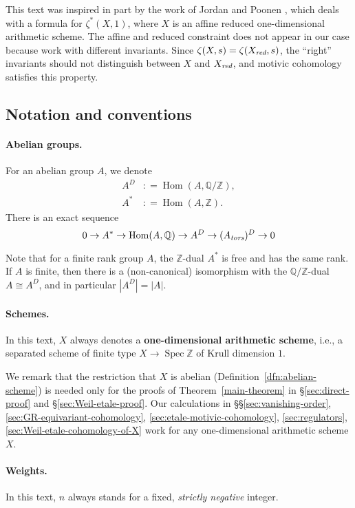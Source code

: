 \documentclass{article}
\DeclareMathOperator{\Hom}{Hom}
\DeclareMathOperator{\Spec}{Spec}
\newcommand{\QQ}{\mathbb{Q}}
\newcommand{\ZZ}{\mathbb{Z}}
\newcommand{\red}{\text{\it red}}
\newcommand{\tors}{\text{\it tors}}
\newcommand{\dfn}{\mathrel{\mathop:}=}
\theoremstyle{myplain}
\theoremstyle{mydefinition}
\begin{document}
This text was inspired in part by the work of Jordan and Poonen
\cite{Jordan-Poonen-2020}, which deals with a formula for $\zeta^* (X,1)$, where
$X$ is an affine reduced one-dimensional arithmetic scheme. The affine and
reduced constraint does not appear in our case because work with different
invariants. Since $\zeta (X,s) = \zeta (X_\red, s)$, the ``right'' invariants
should not distinguish between $X$ and $X_\red$, and motivic cohomology
satisfies this property.

\subsection*{Notation and conventions}

\paragraph{Abelian groups.}
For an abelian group $A$, we denote
\begin{align*}
  A^D & \dfn \Hom (A, \QQ/\ZZ), \\
  A^* & \dfn \Hom (A, \ZZ).
\end{align*}
There is an exact sequence
\begin{equation}
  \label{eqn:exact-sequence-A*-etc}
  0 \to A^* \to \Hom (A,\QQ) \to A^D \to (A_\tors)^D \to 0
\end{equation}

Note that for a finite rank group $A$, the $\ZZ$-dual $A^*$ is free and has the same
rank. If $A$ is finite, then there is a (non-canonical) isomorphism with the
$\QQ/\ZZ$-dual $A \cong A^D$, and in particular $|A^D| = |A|$.

\paragraph{Schemes.}
In this text, $X$ always denotes a \textbf{one-dimensional arithmetic scheme},
i.e., a separated scheme of finite type $X \to \Spec \ZZ$ of Krull dimension
$1$.

We remark that the restriction that $X$ is abelian
(Definition~\ref{dfn:abelian-scheme}) is needed only for the
proofs of Theorem~\ref{main-theorem} in \S\ref{sec:direct-proof} and
\S\ref{sec:Weil-etale-proof}. Our calculations in
\S\S\ref{sec:vanishing-order},
\ref{sec:GR-equivariant-cohomology},
\ref{sec:etale-motivic-cohomology},
\ref{sec:regulators},
\ref{sec:Weil-etale-cohomology-of-X}
work for any one-dimensional arithmetic scheme $X$.

\paragraph{Weights.}
In this text, $n$ always stands for a fixed, \emph{strictly negative} integer.
\end{document}
